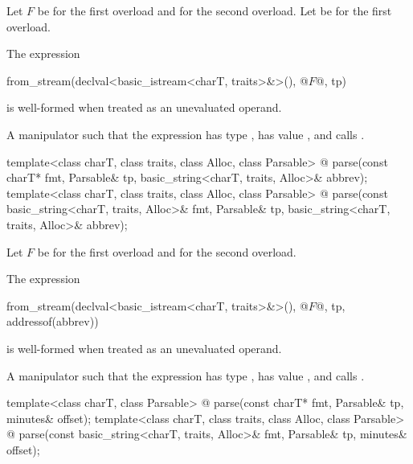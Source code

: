 \begin{itemdescr}
\pnum
Let $F$ be  for the first overload and
 for the second overload.
Let  be  for the first overload.

\pnum
\constraints
The expression
\begin{codeblock}
from_stream(declval<basic_istream<charT, traits>&>(), @$F$@, tp)
\end{codeblock}
is well-formed when treated as an unevaluated operand.

\pnum
\returns
A manipulator such that
the expression 
has type ,
has value , and
calls .
\end{itemdescr}

\begin{itemdecl}
template<class charT, class traits, class Alloc, class Parsable>
  @\unspec@
    parse(const charT* fmt, Parsable& tp,
          basic_string<charT, traits, Alloc>& abbrev);
template<class charT, class traits, class Alloc, class Parsable>
  @\unspec@
    parse(const basic_string<charT, traits, Alloc>& fmt, Parsable& tp,
          basic_string<charT, traits, Alloc>& abbrev);
\end{itemdecl}

\begin{itemdescr}
\pnum
Let $F$ be  for the first overload and
 for the second overload.

\pnum
\constraints
The expression
\begin{codeblock}
from_stream(declval<basic_istream<charT, traits>&>(), @$F$@, tp, addressof(abbrev))
\end{codeblock}
is well-formed when treated as an unevaluated operand.

\pnum
\returns
A manipulator such that
the expression 
has type ,
has value , and
calls .
\end{itemdescr}

\begin{itemdecl}
template<class charT, class Parsable>
  @\unspec@
    parse(const charT* fmt, Parsable& tp, minutes& offset);
template<class charT, class traits, class Alloc, class Parsable>
  @\unspec@
    parse(const basic_string<charT, traits, Alloc>& fmt, Parsable& tp,
          minutes& offset);
\end{itemdecl}

